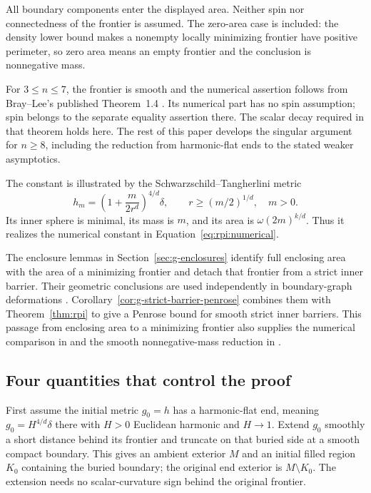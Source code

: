 All boundary components enter the displayed area. Neither spin nor
connectedness of the frontier is assumed. The zero-area case is
included: the density lower bound makes a nonempty locally minimizing
frontier have positive perimeter, so zero area means an empty
frontier and the conclusion is nonnegative mass.

For $3\le n\le7$, the frontier is smooth and the numerical assertion
follows from Bray--Lee's published Theorem~1.4 \cite{BrayLee2009}. Its
numerical part has no spin assumption; spin belongs to the separate equality
assertion there. The scalar decay required in that theorem holds here.
The rest of this paper develops the singular argument for $n\ge8$,
including the reduction from harmonic-flat ends to the stated weaker
asymptotics.

The constant is illustrated by the Schwarzschild--Tangherlini metric
\cite{Tangherlini1963}
\[
 h_m=\left(1+\frac{m}{2r^d}\right)^{4/d}\delta,
 \qquad r\ge(m/2)^{1/d},\quad m>0.
\]
Its inner sphere is minimal, its mass is $m$, and its area is
$\omega(2m)^{k/d}$. Thus it realizes the numerical constant in
Equation~\eqref{eq:rpi:numerical}.

The enclosure lemmas in Section~\ref{sec:g-enclosures} identify full
enclosing area with the area of a minimizing frontier and detach that
frontier from a strict inner barrier. Their geometric conclusions are
used independently in boundary-graph deformations
\cite{CompanionBoundaryGraphs}. Corollary~\ref{cor:g-strict-barrier-penrose}
combines them with Theorem~\ref{thm:rpi} to give a Penrose bound for smooth
strict inner barriers. This passage from enclosing area to a minimizing
frontier also supplies the numerical comparison in
\cite{CompanionSpacetimeNumerical} and the smooth nonnegative-mass
reduction in \cite{CompanionSpacetimeRigidity}.

\subsection{Four quantities that control the proof}

First assume the initial metric $g_0=h$ has a harmonic-flat end,
meaning $g_0=H^{4/d}\delta$ there with $H>0$ Euclidean harmonic and
$H\to1$. Extend $g_0$ smoothly a short distance behind its frontier
and truncate on that buried side at a smooth compact boundary. This
gives an ambient exterior $M$ and an initial filled region $K_0$
containing the buried boundary; the original end exterior is
$M\setminus K_0$. The extension needs no scalar-curvature sign behind
the original frontier.

